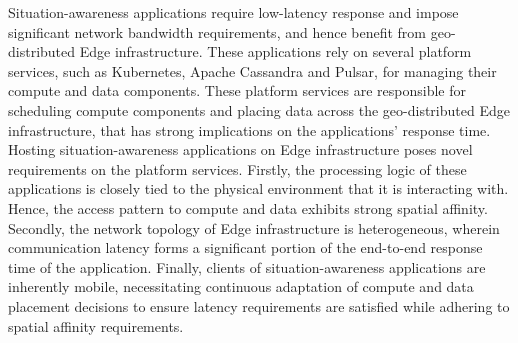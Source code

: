 \begin{summary}
Situation-awareness applications require low-latency response and impose significant network bandwidth requirements, and hence benefit from geo-distributed Edge infrastructure. These applications rely on several platform services, such as Kubernetes, Apache Cassandra and Pulsar, for managing their compute and data components. These platform services are responsible for scheduling compute components and placing data across the geo-distributed Edge infrastructure, that has strong implications on the applications’ response time. Hosting situation-awareness applications on Edge infrastructure poses novel requirements on the platform services. Firstly, the processing logic of these applications is closely tied to the physical environment that it is interacting with. Hence, the access pattern to compute and data exhibits strong spatial affinity. Secondly, the network topology of Edge infrastructure is heterogeneous, wherein communication latency forms a significant portion of the end-to-end response time of the application. Finally, clients of situation-awareness applications are inherently mobile, necessitating continuous adaptation of compute and data placement decisions to ensure latency requirements are satisfied while adhering to spatial affinity requirements.


\end{summary}
